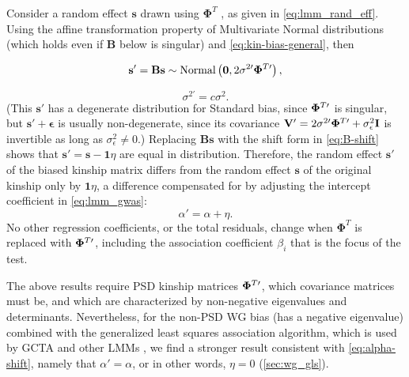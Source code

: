 \documentclass[11pt]{article}
\newcommand{\kinMat}[1][T]{%
  \ensuremath{%
    \mathbf{\Phi}^{#1}
  }%
  \xspace%
}%
\newcommand{\kinMatPrime}{%
  \ensuremath{%
    \mathbf{\Phi}^{T\prime}
  }%
  \xspace%
}%
\begin{document}
\begin{linenumbers}
Consider a random effect $\mathbf{s}$ drawn using \kinMat, as given in \cref{eq:lmm_rand_eff}.
Using the affine transformation property of Multivariate Normal distributions (which holds even if $\mathbf{B}$ below is singular) and \cref{eq:kin-bias-general}, then
\begin{linenomath*}
$$
\mathbf{s}'
=
\mathbf{B} \mathbf{s}
\sim
\text{Normal} \left( \mathbf{0}, 2 \sigma^{2\prime} \kinMatPrime \right),
$$
\end{linenomath*}
\begin{equation}
  \label{eq:sigma-rescale}
  \sigma^{2\prime} = c \sigma^2
  .
\end{equation}
(This $\mathbf{s}'$ has a degenerate distribution for Standard bias, since $\kinMatPrime$ is singular, but $\mathbf{s}' + \boldsymbol{\epsilon}$ is usually non-degenerate, since its covariance $\mathbf{V}' = 2 \sigma^{2\prime} \kinMatPrime + \sigma^2_\epsilon \mathbf{I}$ is invertible as long as $\sigma^2_\epsilon \ne 0$.)
Replacing $\mathbf{B} \mathbf{s}$ with the shift form in \cref{eq:B-shift} shows that
$\mathbf{s}' = \mathbf{s} - \mathbf{1} \eta$
are equal in distribution.
Therefore, the random effect $\mathbf{s}'$ of the biased kinship matrix differs from the random effect $\mathbf{s}$ of the original kinship only by $\mathbf{1} \eta$, a difference compensated for by adjusting the intercept coefficient in \cref{eq:lmm_gwas}:
\begin{equation}
  \label{eq:alpha-shift}
  \alpha' = \alpha + \eta.
\end{equation}
No other regression coefficients, or the total residuals, change when \kinMat is replaced with $\kinMatPrime$, including the association coefficient $\beta_i$ that is the focus of the test.

The above results require PSD kinship matrices $\kinMatPrime$, which covariance matrices must be, and which are characterized by non-negative eigenvalues and determinants.
Nevertheless, for the non-PSD WG bias (has a negative eigenvalue) combined with the generalized least squares association algorithm, which is used by GCTA and other LMMs \citep{kang_efficient_2008, kang_variance_2010, yang_advantages_2014}, we find a stronger result consistent with \cref{eq:alpha-shift}, namely that $\alpha' = \alpha$, or in other words, $\eta = 0$ (\cref{sec:wg_gls}).


\end{linenumbers}
\end{document}
